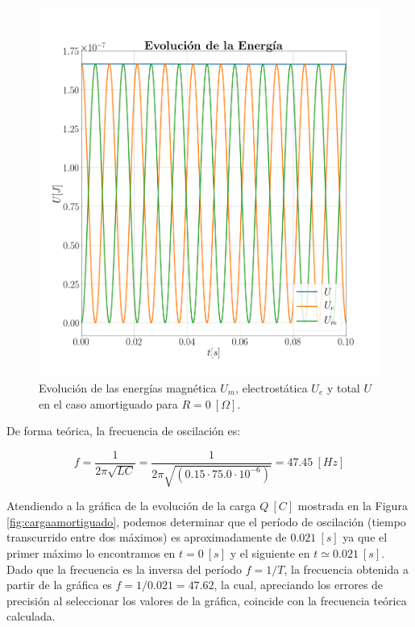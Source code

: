 \documentclass[journal]{IEEEtran}
\begin{document}
\begin{figure}[!htb]
    \centering
    \includegraphics[width=\linewidth,trim={40 70 70 70},clip]{energiaamortiguado.png}
    \caption{Evolución de las energías magnética $U_m$, electrostática $U_e$ y total $U$ en el caso amortiguado para $R=0~[\Omega]$.}
    \label{fig:energiaamortiguado}
\end{figure}

De forma teórica, la frecuencia de oscilación es:

\begin{equation}
f = \frac{1}{2\pi\sqrt{LC}} = \frac{1}{2\pi\sqrt{(0.15 \cdot 75.0 \cdot 10^{-6})}} = 47.45~[Hz]
\end{equation}

Atendiendo a la gráfica de la evolución de la carga $Q~[C]$ mostrada en la Figura \ref{fig:cargaamortiguado}, podemos determinar que el período de oscilación (tiempo transcurrido entre dos máximos) es aproximadamente de $0.021~[s]$ ya que el primer máximo lo encontramos en $t=0~[s]$ y el siguiente en $t\simeq 0.021~[s]$. Dado que la frecuencia es la inversa del período $f = 1/T$, la frecuencia obtenida a partir de la gráfica es $f = 1 / 0.021 = 47.62$, la cual, apreciando los errores de precisión al seleccionar los valores de la gráfica, coincide con la frecuencia teórica calculada.
\end{document}
